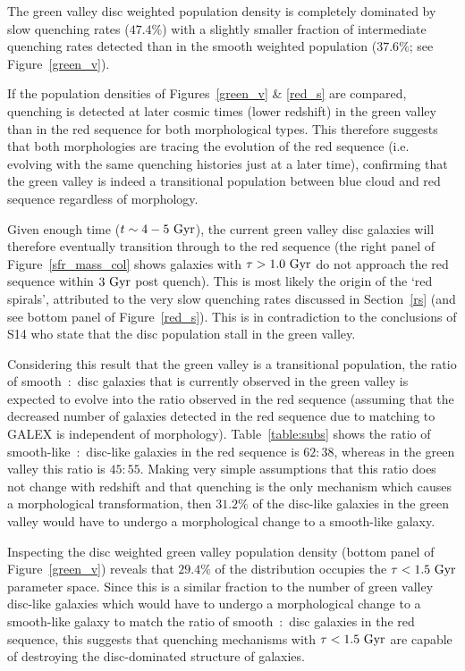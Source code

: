 The green valley disc weighted population density is completely dominated by slow quenching rates ($47.4\%$) with a slightly smaller fraction of intermediate quenching rates detected than in the smooth weighted population ($37.6\%$; see Figure~\ref{green_v}).

If the population densities of Figures~\ref{green_v} \& \ref{red_s} are compared, quenching is detected at later cosmic times (lower redshift) in the green valley than in the red sequence for both morphological types. This therefore suggests that both morphologies are tracing the evolution of the red sequence (i.e. evolving with the same quenching histories just at a later time), confirming that the green valley is indeed a transitional population between blue cloud and red sequence regardless of morphology. 

Given enough time ($t\sim4 - 5~\rm{Gyr}$), the current green valley disc galaxies will therefore eventually transition through to the red sequence (the right panel of Figure~\ref{sfr_mass_col} shows galaxies with $\tau > 1.0~\rm{Gyr}$ do not approach the red sequence within $3~\rm{Gyr}$ post quench). This is most likely the origin of the `red spirals', attributed to the very slow quenching rates discussed in Section~\ref{rs} (and see bottom panel of Figure~\ref{red_s}). This is in contradiction to the conclusions of S14 who state that the disc population stall in the green valley. 

Considering this result that the green valley is a transitional population, the ratio of smooth~:~disc galaxies that is currently observed in the green valley is expected to evolve into the ratio observed in the red sequence (assuming that the decreased number of galaxies detected in the red sequence due to matching to GALEX is independent of morphology). Table~\ref{table:subs} shows the ratio of smooth-like~:~disc-like galaxies in the red sequence is $62:38$, whereas in the green valley this ratio is $45:55$. Making very simple assumptions that this ratio does not change with redshift and that quenching is the only mechanism which causes a morphological transformation, then $31.2\%$ of the disc-like galaxies in the green valley would have to undergo a morphological change to a smooth-like galaxy. 

Inspecting the disc weighted green valley population density (bottom panel of Figure~\ref{green_v}) reveals that $29.4\%$ of the distribution occupies the $\tau < 1.5 ~\rm{Gyr}$ parameter space. Since this is a similar fraction to the number of green valley disc-like galaxies which would have to undergo a morphological change to a smooth-like galaxy to match the ratio of smooth~:~disc galaxies in the red sequence, this suggests that quenching mechanisms with $\tau < 1.5 ~\rm{Gyr}$ are capable of destroying the disc-dominated structure of galaxies. 

